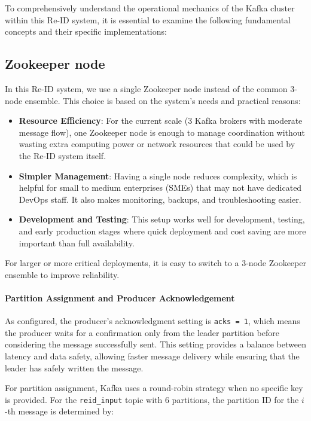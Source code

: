 To comprehensively understand the operational mechanics of the Kafka cluster within this Re-ID system, it is essential to examine the following fundamental concepts and their specific implementations:

\subsection{Zookeeper node}

In this Re-ID system, we use a single Zookeeper node instead of the common 3-node ensemble. This choice is based on the system's needs and practical reasons:

\begin{itemize}
    \item \textbf{Resource Efficiency}: For the current scale (3 Kafka brokers with moderate message flow), one Zookeeper node is enough to manage coordination without wasting extra computing power or network resources that could be used by the Re-ID system itself.
    
    \item \textbf{Simpler Management}: Having a single node reduces complexity, which is helpful for small to medium enterprises (SMEs) that may not have dedicated DevOps staff. It also makes monitoring, backups, and troubleshooting easier.
    
    \item \textbf{Development and Testing}: This setup works well for development, testing, and early production stages where quick deployment and cost saving are more important than full availability.
\end{itemize}

For larger or more critical deployments, it is easy to switch to a 3-node Zookeeper ensemble to improve reliability.

\paragraph{Partition Assignment and Producer Acknowledgement}

As configured, the producer's acknowledgment setting is \texttt{acks = 1}, which means the producer waits for a confirmation only from the leader partition before considering the message successfully sent. This setting provides a balance between latency and data safety, allowing faster message delivery while ensuring that the leader has safely written the message.

For partition assignment, Kafka uses a round-robin strategy when no specific key is provided. For the \texttt{reid\_input} topic with 6 partitions, the partition ID for the \(i\)-th message is determined by:

